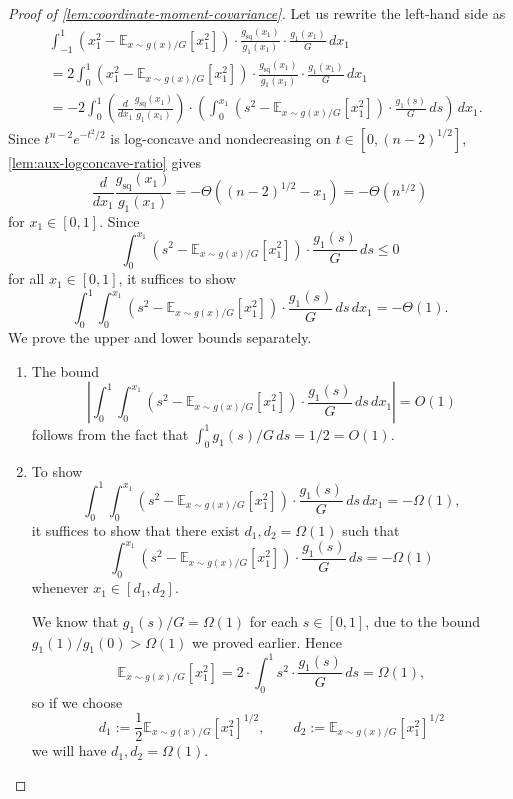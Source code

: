 \documentclass[11pt]{article}
\numberwithin{equation}{section}
\theoremstyle{definition}
\newcommand{\E}[2]{\mathbb{E}_{#1}\left[#2\right]}
\begin{document}
\begin{proof}[Proof of \cref{lem:coordinate-moment-covariance}]
Let us rewrite the left-hand side as
\begin{align*}
&\int_{-1}^1\left(x_1^2-\E{x\sim g(x)/G}{x_1^2}\right)\cdot\frac{g_{\mathrm{sq}}(x_1)}{g_1(x_1)}\cdot\frac{g_1(x_1)}{G}\,dx_1\\
&=2\int_0^1\left(x_1^2-\E{x\sim g(x)/G}{x_1^2}\right)\cdot\frac{g_{\mathrm{sq}}(x_1)}{g_1(x_1)}\cdot\frac{g_1(x_1)}{G}\,dx_1\\
&=-2\int_0^1\left(\frac{d}{dx_1}\frac{g_{\mathrm{sq}}(x_1)}{g_1(x_1)}\right)\cdot
\left(\int_0^{x_1}\left(s^2-\E{x\sim g(x)/G}{x_1^2}\right)\cdot\frac{g_1(s)}{G}\,ds\right)\,dx_1.
\end{align*}
Since $t^{n-2}e^{-t^2/2}$ is log-concave and nondecreasing on
$t\in[0,(n-2)^{1/2}]$, \cref{lem:aux-logconcave-ratio} gives
\[
\frac{d}{dx_1}\frac{g_{\mathrm{sq}}(x_1)}{g_1(x_1)}
=-\Theta((n-2)^{1/2}-x_1)
=-\Theta(n^{1/2})
\]
for $x_1\in[0,1]$.
Since
\[
\int_0^{x_1}\left(s^2-\E{x\sim g(x)/G}{x_1^2}\right)\cdot\frac{g_1(s)}{G}\,ds\le0
\]
for all $x_1\in[0,1]$, it suffices to show
\[
\int_0^1\int_0^{x_1}\left(s^2-\E{x\sim g(x)/G}{x_1^2}\right)\cdot\frac{g_1(s)}{G}\,ds\,dx_1=-\Theta(1).
\]
We prove the upper and lower bounds separately.
\begin{enumerate}[label=(\roman*)]
\item The bound
\[
\left|\int_0^1\int_0^{x_1}\left(s^2-\E{x\sim g(x)/G}{x_1^2}\right)\cdot\frac{g_1(s)}{G}\,ds\,dx_1\right|=O(1)
\]
follows from the fact that $\int_0^1g_1(s)/G\,ds=1/2=O(1)$.

\item To show
\[
\int_0^1\int_0^{x_1}\left(s^2-\E{x\sim g(x)/G}{x_1^2}\right)\cdot\frac{g_1(s)}{G}\,ds\,dx_1=-\Omega(1),
\]
it suffices to show that there exist $d_1,d_2=\Omega(1)$ such that
\begin{equation}
\int_0^{x_1}\left(s^2-\E{x\sim g(x)/G}{x_1^2}\right)\cdot\frac{g_1(s)}{G}\,ds=-\Omega(1)
\label{eq:coordinate-moment-window}
\end{equation}
whenever $x_1\in[d_1,d_2]$.

We know that $g_1(s)/G=\Omega(1)$ for each
$s\in[0,1]$, due to the bound
$g_1(1)/g_1(0)>\Omega(1)$ we proved earlier.
Hence
\[
\E{x\sim g(x)/G}{x_1^2}
=2 \cdot\int_0^1s^2\cdot\frac{g_1(s)}{G}\,ds
=\Omega(1),
\]
so if we choose
\[
d_1:=\frac12\E{x\sim g(x)/G}{x_1^2}^{1/2},
\qquad
d_2:=\E{x\sim g(x)/G}{x_1^2}^{1/2}
\]
we will have $d_1,d_2=\Omega(1)$.


\end{enumerate}
\end{proof}
\end{document}
